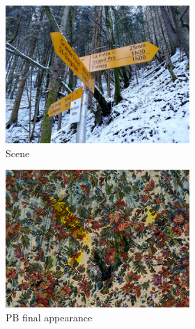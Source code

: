 \begin{figure}[ht]
\begin{subfigure}{\textwidth}
        \begin{subfigure}{0.3\textwidth}
            \centering
            \includegraphics[width=\textwidth]{images/01-results_teaser-bg.jpg}
            \caption{Scene}
            \label{fig:intro_results_teaser_bg}
        \end{subfigure}
        \hfill
        \begin{subfigure}{0.3\textwidth}
            \centering
            \includegraphics[width=\textwidth]{images/01-results_teaser-pixels_proj.jpg}
            \caption{PB final appearance}
            \label{fig:intro_results_teaser_pixels_proj}
        \end{subfigure}
        \hfill
        \begin{subfigure}{0.3\textwidth}

\end{subfigure}
\end{subfigure}
\end{figure}
